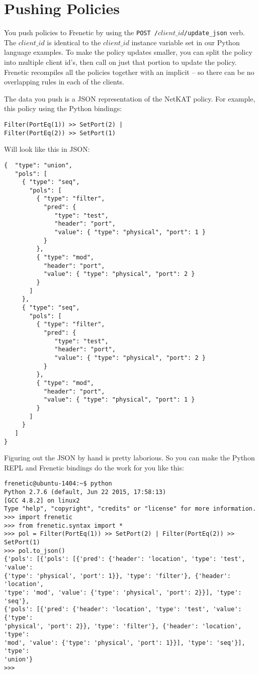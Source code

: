 \section{Pushing Policies}

You push policies to Frenetic by using the \texttt{POST /$client\_id$/update\_json} verb.  The 
$client\_id$ is identical to the $client\_id$ instance variable set in our Python language examples.
To make the policy updates smaller, you can split the policy into multiple client id's, then 
call  on just that portion to update the policy.   Frenetic recompiles all the
policies together with an implicit  -- so there can be no overlapping rules in each 
of the clients.  

The data you push is a JSON representation of the NetKAT policy.  For example, this policy using
the Python bindings:

\begin{verbatim}
Filter(PortEq(1)) >> SetPort(2) |
Filter(PortEq(2)) >> SetPort(1) 
\end{verbatim}

Will look like this in JSON:

\begin{verbatim}
{  "type": "union",
   "pols": [
     { "type": "seq",
       "pols": [
         { "type": "filter", 
           "pred": { 
              "type": "test", 
              "header": "port",
              "value": { "type": "physical", "port": 1 }
           }
         },
         { "type": "mod",
           "header": "port",
           "value": { "type": "physical", "port": 2 }
         }
       ]  
     },
     { "type": "seq",
       "pols": [
         { "type": "filter", 
           "pred": { 
              "type": "test", 
              "header": "port",
              "value": { "type": "physical", "port": 2 } 
           }
         },
         { "type": "mod",
           "header": "port",
           "value": { "type": "physical", "port": 1 }
         }
       ]  
     }
   ]
}
\end{verbatim}

Figuring out the JSON by hand is pretty laborious.  So you can make the Python REPL and Frenetic 
bindings do the work for you like this:

\begin{verbatim}
frenetic@ubuntu-1404:~$ python
Python 2.7.6 (default, Jun 22 2015, 17:58:13)
[GCC 4.8.2] on linux2
Type "help", "copyright", "credits" or "license" for more information.
>>> import frenetic
>>> from frenetic.syntax import *
>>> pol = Filter(PortEq(1)) >> SetPort(2) | Filter(PortEq(2)) >> SetPort(1)
>>> pol.to_json()
{'pols': [{'pols': [{'pred': {'header': 'location', 'type': 'test', 'value': 
{'type': 'physical', 'port': 1}}, 'type': 'filter'}, {'header': 'location', 
'type': 'mod', 'value': {'type': 'physical', 'port': 2}}], 'type': 'seq'}, 
{'pols': [{'pred': {'header': 'location', 'type': 'test', 'value': {'type': 
'physical', 'port': 2}}, 'type': 'filter'}, {'header': 'location', 'type': 
'mod', 'value': {'type': 'physical', 'port': 1}}], 'type': 'seq'}], 'type': 
'union'}
>>>
\end{verbatim}

